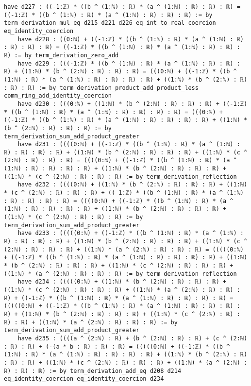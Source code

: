 \documentclass{article}
\begin{document}
\begin{tcolorbox}[colback=white!10, width=\linewidth]
\begin{lstlisting}[language=Lean4]
    have d227 : ((-1:ℤ) * ((b ^ (1:ℕ) : ℝ) * (a ^ (1:ℕ) : ℝ) : ℝ) : ℝ) = ((-1:ℤ) * ((b ^ (1:ℕ) : ℝ) * (a ^ (1:ℕ) : ℝ) : ℝ) : ℝ) := by term_derivation_mul_eq d215 d221 d226 eq_int_to_real_coercion eq_identity_coercion
    have d228 : ((0:ℕ) + ((-1:ℤ) * ((b ^ (1:ℕ) : ℝ) * (a ^ (1:ℕ) : ℝ) : ℝ) : ℝ) : ℝ) = ((-1:ℤ) * ((b ^ (1:ℕ) : ℝ) * (a ^ (1:ℕ) : ℝ) : ℝ) : ℝ) := by term_derivation_zero_add
    have d229 : (((-1:ℤ) * ((b ^ (1:ℕ) : ℝ) * (a ^ (1:ℕ) : ℝ) : ℝ) : ℝ) + ((1:ℕ) * (b ^ (2:ℕ) : ℝ) : ℝ) : ℝ) = (((0:ℕ) + ((-1:ℤ) * ((b ^ (1:ℕ) : ℝ) * (a ^ (1:ℕ) : ℝ) : ℝ) : ℝ) : ℝ) + ((1:ℕ) * (b ^ (2:ℕ) : ℝ) : ℝ) : ℝ) := by term_derivation_product_add_product_less comm_ring_add_identity_coercion
    have d230 : (((0:ℕ) + ((1:ℕ) * (b ^ (2:ℕ) : ℝ) : ℝ) : ℝ) + ((-1:ℤ) * ((b ^ (1:ℕ) : ℝ) * (a ^ (1:ℕ) : ℝ) : ℝ) : ℝ) : ℝ) = (((0:ℕ) + ((-1:ℤ) * ((b ^ (1:ℕ) : ℝ) * (a ^ (1:ℕ) : ℝ) : ℝ) : ℝ) : ℝ) + ((1:ℕ) * (b ^ (2:ℕ) : ℝ) : ℝ) : ℝ) := by term_derivation_sum_add_product_greater
    have d231 : ((((0:ℕ) + ((-1:ℤ) * ((b ^ (1:ℕ) : ℝ) * (a ^ (1:ℕ) : ℝ) : ℝ) : ℝ) : ℝ) + ((1:ℕ) * (b ^ (2:ℕ) : ℝ) : ℝ) : ℝ) + ((1:ℕ) * (c ^ (2:ℕ) : ℝ) : ℝ) : ℝ) = ((((0:ℕ) + ((-1:ℤ) * ((b ^ (1:ℕ) : ℝ) * (a ^ (1:ℕ) : ℝ) : ℝ) : ℝ) : ℝ) + ((1:ℕ) * (b ^ (2:ℕ) : ℝ) : ℝ) : ℝ) + ((1:ℕ) * (c ^ (2:ℕ) : ℝ) : ℝ) : ℝ) := by term_derivation_reflection
    have d232 : ((((0:ℕ) + ((1:ℕ) * (b ^ (2:ℕ) : ℝ) : ℝ) : ℝ) + ((1:ℕ) * (c ^ (2:ℕ) : ℝ) : ℝ) : ℝ) + ((-1:ℤ) * ((b ^ (1:ℕ) : ℝ) * (a ^ (1:ℕ) : ℝ) : ℝ) : ℝ) : ℝ) = ((((0:ℕ) + ((-1:ℤ) * ((b ^ (1:ℕ) : ℝ) * (a ^ (1:ℕ) : ℝ) : ℝ) : ℝ) : ℝ) + ((1:ℕ) * (b ^ (2:ℕ) : ℝ) : ℝ) : ℝ) + ((1:ℕ) * (c ^ (2:ℕ) : ℝ) : ℝ) : ℝ) := by term_derivation_sum_add_product_greater
    have d233 : (((((0:ℕ) + ((-1:ℤ) * ((b ^ (1:ℕ) : ℝ) * (a ^ (1:ℕ) : ℝ) : ℝ) : ℝ) : ℝ) + ((1:ℕ) * (b ^ (2:ℕ) : ℝ) : ℝ) : ℝ) + ((1:ℕ) * (c ^ (2:ℕ) : ℝ) : ℝ) : ℝ) + ((1:ℕ) * (a ^ (2:ℕ) : ℝ) : ℝ) : ℝ) = (((((0:ℕ) + ((-1:ℤ) * ((b ^ (1:ℕ) : ℝ) * (a ^ (1:ℕ) : ℝ) : ℝ) : ℝ) : ℝ) + ((1:ℕ) * (b ^ (2:ℕ) : ℝ) : ℝ) : ℝ) + ((1:ℕ) * (c ^ (2:ℕ) : ℝ) : ℝ) : ℝ) + ((1:ℕ) * (a ^ (2:ℕ) : ℝ) : ℝ) : ℝ) := by term_derivation_reflection
    have d234 : (((((0:ℕ) + ((1:ℕ) * (b ^ (2:ℕ) : ℝ) : ℝ) : ℝ) + ((1:ℕ) * (c ^ (2:ℕ) : ℝ) : ℝ) : ℝ) + ((1:ℕ) * (a ^ (2:ℕ) : ℝ) : ℝ) : ℝ) + ((-1:ℤ) * ((b ^ (1:ℕ) : ℝ) * (a ^ (1:ℕ) : ℝ) : ℝ) : ℝ) : ℝ) = (((((0:ℕ) + ((-1:ℤ) * ((b ^ (1:ℕ) : ℝ) * (a ^ (1:ℕ) : ℝ) : ℝ) : ℝ) : ℝ) + ((1:ℕ) * (b ^ (2:ℕ) : ℝ) : ℝ) : ℝ) + ((1:ℕ) * (c ^ (2:ℕ) : ℝ) : ℝ) : ℝ) + ((1:ℕ) * (a ^ (2:ℕ) : ℝ) : ℝ) : ℝ) := by term_derivation_sum_add_product_greater
    have d235 : ((((a ^ (2:ℕ) : ℝ) + (b ^ (2:ℕ) : ℝ) : ℝ) + (c ^ (2:ℕ) : ℝ) : ℝ) + (-(a * b : ℝ) : ℝ) : ℝ) = (((((0:ℕ) + ((-1:ℤ) * ((b ^ (1:ℕ) : ℝ) * (a ^ (1:ℕ) : ℝ) : ℝ) : ℝ) : ℝ) + ((1:ℕ) * (b ^ (2:ℕ) : ℝ) : ℝ) : ℝ) + ((1:ℕ) * (c ^ (2:ℕ) : ℝ) : ℝ) : ℝ) + ((1:ℕ) * (a ^ (2:ℕ) : ℝ) : ℝ) : ℝ) := by term_derivation_add_eq d208 d214 eq_identity_coercion eq_identity_coercion d234

\end{lstlisting}
\end{tcolorbox}
\end{document}
